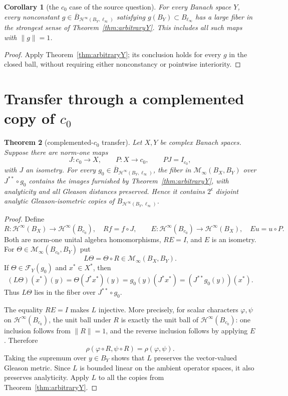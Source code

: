 \documentclass[11pt]{article}
\newtheorem{theorem}{Theorem}
\newtheorem{corollary}[theorem]{Corollary}
\newcommand{\Hinf}{\mathcal H^\infty}
\newcommand{\Minf}{\mathcal M_\infty}
\newcommand{\F}{\mathscr F}
\begin{document}
\begin{corollary}[the $c_0$ case of the source question]\label{cor:c0}
For every Banach space $Y$, every nonconstant
$g\in\overline B_{\Hinf(B_Y,\ell_\infty)}$ satisfying
$g(B_Y)\subset B_{\ell_\infty}$ has a large fiber in the strongest sense of
Theorem~\ref{thm:arbitraryY}.  This includes all such maps with $\|g\|=1$.
\end{corollary}

\begin{proof}
Apply Theorem~\ref{thm:arbitraryY}; its conclusion holds for every $g$ in the
closed ball, without requiring either nonconstancy or pointwise interiority.
\end{proof}

\section{Transfer through a complemented copy of \texorpdfstring{$c_0$}{c0}}

\begin{theorem}[complemented-$c_0$ transfer]\label{thm:transfer}
Let $X,Y$ be complex Banach spaces.  Suppose there are norm-one maps
\[
 J:c_0\longrightarrow X,\qquad P:X\longrightarrow c_0,\qquad PJ=I_{c_0},
\]
with $J$ an isometry.  For every
$g_0\in\overline B_{\Hinf(B_Y,\ell_\infty)}$, the fiber in
$\Minf(B_X,B_Y)$ over $J^{**}\circ g_0$ contains the images furnished by
Theorem~\ref{thm:arbitraryY}, with analyticity and all Gleason distances
preserved.  Hence it contains $2^{\mathfrak c}$ disjoint analytic
Gleason-isometric copies of $B_{\Hinf(B_Y,\ell_\infty)}$.
\end{theorem}

\begin{proof}
Define
\[
 R:\Hinf(B_X)\to\Hinf(B_{c_0}),\quad Rf=f\circ J,
 \qquad
 E:\Hinf(B_{c_0})\to\Hinf(B_X),\quad Eu=u\circ P.
\]
Both are norm-one unital algebra homomorphisms, $RE=I$, and $E$ is an
isometry.  For
$\Theta\in\Minf(B_{c_0},B_Y)$ put
\[
 L\Theta=\Theta\circ R\in\Minf(B_X,B_Y).
\]
If $\Theta\in\F_Y(g_0)$ and $x^*\in X^*$, then
\[
 (L\Theta)(x^*)(y)
 =\Theta(J^*x^*)(y)
 =g_0(y)(J^*x^*)
 =(J^{**}g_0(y))(x^*).
\]
Thus $L\Theta$ lies in the fiber over $J^{**}\circ g_0$.

The equality $RE=I$ makes $L$ injective.  More precisely, for scalar
characters $\varphi,\psi$ on $\Hinf(B_{c_0})$, the unit ball under $R$ is
exactly the unit ball of $\Hinf(B_{c_0})$: one inclusion follows from
$\|R\|=1$, and the reverse inclusion follows by applying $E$.  Therefore
\[
 \rho(\varphi\circ R,\psi\circ R)=\rho(\varphi,\psi).
\]
Taking the supremum over $y\in B_Y$ shows that $L$ preserves the
vector-valued Gleason metric.  Since $L$ is bounded linear on the ambient
operator spaces, it also preserves analyticity.  Apply $L$ to all the copies
from Theorem~\ref{thm:arbitraryY}.
\end{proof}
\end{document}
